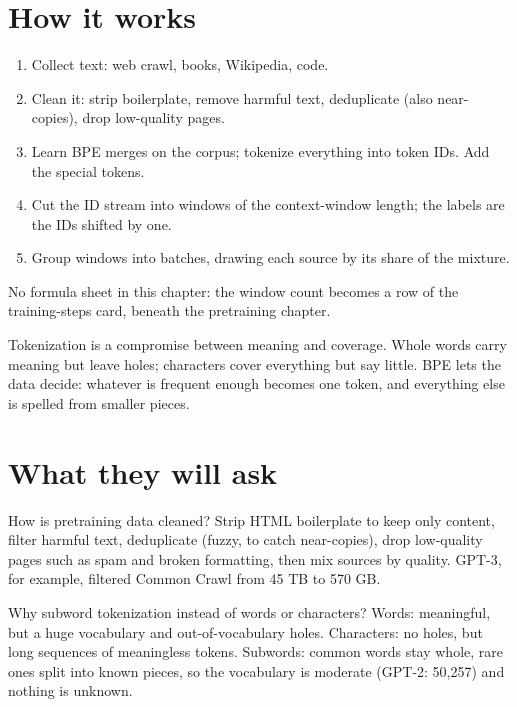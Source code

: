 \section{How it works}
\begin{enumerate}
  \item Collect text: web crawl, books, Wikipedia, code.
  \item Clean it: strip boilerplate, remove harmful text, deduplicate (also near-copies), drop low-quality pages.
  \item Learn BPE merges on the corpus; tokenize everything into token IDs. Add the special tokens.
  \item Cut the ID stream into windows of the context-window length; the labels are the IDs shifted by one.
  \item Group windows into batches, drawing each source by its share of the mixture.
\end{enumerate}

No formula sheet in this chapter: the window count becomes a row of the training-steps card, beneath the pretraining chapter.

\begin{intuition}
Tokenization is a compromise between meaning and coverage. Whole words carry meaning but leave holes; characters cover everything but say little. BPE lets the data decide: whatever is frequent enough becomes one token, and everything else is spelled from smaller pieces.
\end{intuition}

\section{What they will ask}

\begin{iq}[\core]{How is pretraining data cleaned?}
Strip HTML boilerplate to keep only content, filter harmful text, deduplicate (fuzzy, to catch near-copies), drop low-quality pages such as spam and broken formatting, then mix sources by quality. GPT-3, for example, filtered Common Crawl from 45 TB to 570 GB.
\end{iq}

\begin{iq}[\core]{Why subword tokenization instead of words or characters?}
Words: meaningful, but a huge vocabulary and out-of-vocabulary holes. Characters: no holes, but long sequences of meaningless tokens. Subwords: common words stay whole, rare ones split into known pieces, so the vocabulary is moderate (GPT-2: 50,257) and nothing is unknown.
\end{iq}

